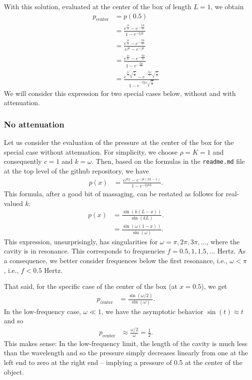 \documentclass{article}
\begin{document}
With this solution, evaluated at the center of the box of length
$L=1$, we obtain
\begin{align*}
  p_\text{center} &= p(0.5)
  \\
  &= \frac{e^{\frac{jk}{2}} - e^{-\frac{3jk}{2}}}{1 - e^{-2jk}}
  \\
  &= \frac{e^{\frac{jk}{2}} - e^{-\frac{3jk}{2}}}{e^{jk} - e^{-jk}}
  \\
  &= \frac{e^{\frac{j\omega}{2c}} - e^{-\frac{3j\omega}{2c}}}{1 - e^{-\frac{2j\omega}{c}}}
  \\
  &= \frac{e^{\frac{j\omega}{2}\sqrt{\frac{\rho}{K}}} - e^{-\frac{3j\omega}{2}\sqrt{\frac{\rho}{K}}}}{1 - e^{-2j\omega\sqrt{\frac{\rho}{K}}}}
\end{align*}
We will consider this expression for two special cases below, without
and with attenuation.


\subsubsection*{No attenuation}

Let us consider the evaluation of the pressure at the center of the
box for the special case without attenuation. For simplicity, we
choose $\rho=K=1$ and consequently $c=1$ and $k=\omega$. Then, based
on the formulas in the \texttt{readme.md} file at the top level of the
github repository, we have
\begin{align*}
  p(x)
  &=
  \frac{e^{jkx} - e^{-jk(2L-x)}}{1 - e^{-2jkL}}.
\end{align*}
This formula, after a good bit of massaging, can be restated as
follows for real-valued $k$:
\begin{align*}
  p(x)
  &=
  \frac{\sin(k(L-x))}{\sin(kL)}.
  \\
  &=
  \frac{\sin(\omega(1-x))}{\sin(\omega)}.
\end{align*}
This expression, unsurprisingly, has singularities for
$\omega=\pi,2\pi,3\pi,...$, where the cavity is in resonance. This
corresponds to frequencies $f=0.5, 1, 1.5, \ldots$ Hertz. As a
consequence, we better consider frequences below the first resonance,
i.e., $\omega<\pi$, i.e., $f<0.5$ Hertz.

That said, for the specific case of the center of the box (at $x=0.5$), we get
\begin{align*}
  p_\text{center}
  &= 
  \frac{\sin(\omega/2)}{\sin(\omega)}.
\end{align*}
In the low-frequency case, $\omega\ll 1$, we have the asymptotic
behavior $\sin(t)\approx t$ and so
\begin{align*}
  p_\text{center}
  &\approx
  \frac{\omega/2}{\omega}
  = \frac 12.
\end{align*}
This makes sense: In the low-frequency limit, the length of the cavity
is much less than the wavelength and so the pressure simply decreases
linearly from one at the left end to zero at the right end -- implying
a pressure of 0.5 at the center of the object.
\end{document}
